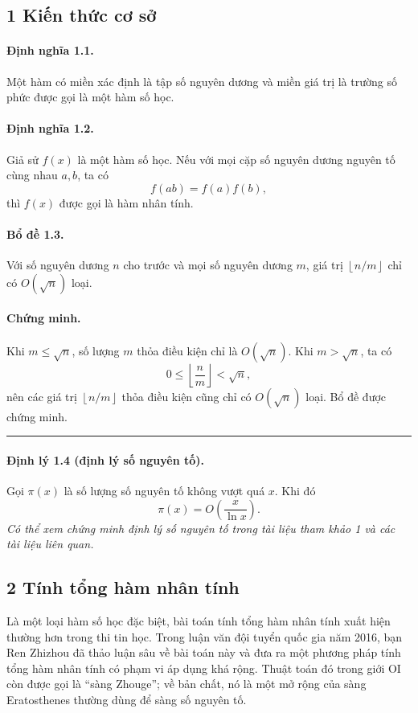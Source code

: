 \documentclass[11pt]{article}
\newcommand{\qedmark}{\hfill\rule{0.7ex}{0.7ex}}
\begin{document}
\subsection*{1 Kiến thức cơ sở}

\paragraph{Định nghĩa 1.1.}
Một hàm có miền xác định là tập số nguyên dương và miền giá trị là trường số
phức được gọi là một hàm số học.

\paragraph{Định nghĩa 1.2.}
Giả sử \(f(x)\) là một hàm số học. Nếu với mọi cặp số nguyên dương nguyên tố
cùng nhau \(a,b\), ta có
\[
  f(ab)=f(a)f(b),
\]
thì \(f(x)\) được gọi là hàm nhân tính.

\paragraph{Bổ đề 1.3.}
Với số nguyên dương \(n\) cho trước và mọi số nguyên dương \(m\), giá trị
\(\left\lfloor n/m\right\rfloor\) chỉ có \(O(\sqrt n)\) loại.

\paragraph{Chứng minh.}
Khi \(m\le\sqrt n\), số lượng \(m\) thỏa điều kiện chỉ là \(O(\sqrt n)\). Khi
\(m>\sqrt n\), ta có
\[
  0\le \left\lfloor\frac{n}{m}\right\rfloor<\sqrt n,
\]
nên các giá trị \(\left\lfloor n/m\right\rfloor\) thỏa điều kiện cũng chỉ có
\(O(\sqrt n)\) loại. Bổ đề được chứng minh. \qedmark

\paragraph{Định lý 1.4 (định lý số nguyên tố).}
Gọi \(\pi(x)\) là số lượng số nguyên tố không vượt quá \(x\). Khi đó
\[
  \pi(x)=O\left(\frac{x}{\ln x}\right).
\]
\emph{Có thể xem chứng minh định lý số nguyên tố trong tài liệu tham khảo 1 và
các tài liệu liên quan.}

\subsection*{2 Tính tổng hàm nhân tính}

Là một loại hàm số học đặc biệt, bài toán tính tổng hàm nhân tính xuất hiện
thường hơn trong thi tin học. Trong luận văn đội tuyển quốc gia năm 2016, bạn
Ren Zhizhou đã thảo luận sâu về bài toán này và đưa ra một phương pháp tính
tổng hàm nhân tính có phạm vi áp dụng khá rộng. Thuật toán đó trong giới OI còn
được gọi là ``sàng Zhouge''; về bản chất, nó là một mở rộng của sàng
Eratosthenes thường dùng để sàng số nguyên tố.
\end{document}
